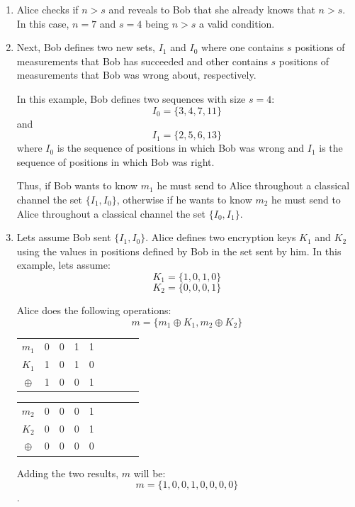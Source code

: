 \begin{enumerate}
  \item Alice checks if $n>s$ and reveals to Bob that she already knows that $n>s$. In this case, $n=7$ and $s=4$ being $n>s$ a valid condition.

  \item Next, Bob defines two new sets, $I_{1}$ and $I_{0}$ where one contains $s$ positions of measurements that Bob has succeeded and other contains $s$ positions of measurements that Bob was wrong about, respectively.

  In this example, Bob defines two sequences with size $s=4$:
  $$I_{0}=\{3,4,7,11 \}$$
  and $$I_{1}= \{2,5,6,13 \}$$ where $I_{0}$ is the sequence of positions in which Bob was wrong and $I_{1}$ is the sequence of positions in which Bob was right.

  Thus, if Bob wants to know $m_{1}$ he must send to Alice throughout a classical channel the set $\{I_{1},I_{0} \}$, otherwise if he wants to know $m_{2}$ he must send to Alice throughout a classical channel the set $\{I_{0},I_{1} \}$.

  \item Lets assume Bob sent $\{I_{1},I_{0} \}$.
   Alice defines two encryption keys $K_{1}$ and $K_{2}$ using the values in positions defined by Bob in the set sent by him. In this example, lets assume: $$K_{1}=\{1,0,1,0\}$$ $$K_{2}=\{0,0,0,1\}$$

   Alice does the following operations:
   $$m = \{m_{1}\oplus K_{1}, m_{2} \oplus K_{2} \}$$

   \begin{table}[H]
    \centering
    \begin{tabular}{c|c c c c c c c c}
     $m_{1}$ & 0 & 0 & 1 & 1 \\
     $K_{1}$ & 1 & 0 & 1 & 0 \\ \hline
     $\oplus$ & 1 & 0 & 0 & 1
    \end{tabular}
    \end{table}

   \begin{table}[H]
    \centering
    \begin{tabular}{c|c c c c c c c c}
     $m_{2}$ & 0 & 0 & 0 & 1 \\
     $K_{2}$ & 0 & 0 & 0 & 1 \\ \hline
     $\oplus$ & 0 & 0 & 0 & 0
    \end{tabular}
    \end{table}

    Adding the two results, $m$ will be: $$m=\{1,0,0,1,0,0,0,0\}$$.


\end{enumerate}
